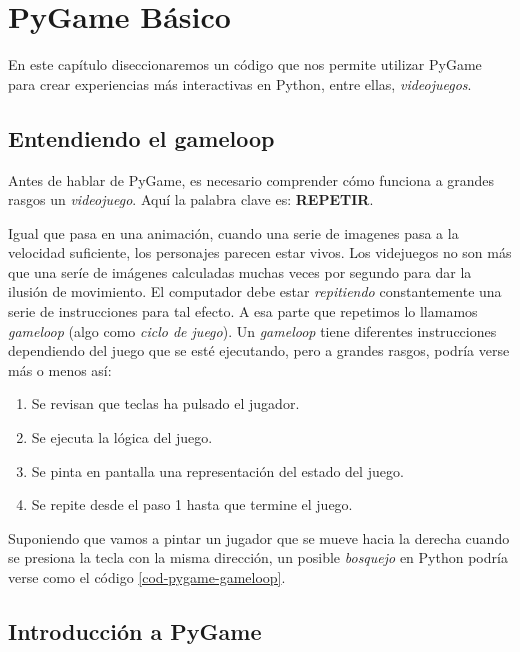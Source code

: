 \chapter{PyGame Básico}
\label{chap:pygame}

En este capítulo diseccionaremos un código que nos permite utilizar PyGame para crear experiencias más interactivas en Python, entre ellas, \emph{videojuegos}.

\section{Entendiendo el gameloop}

Antes de hablar de PyGame, es necesario comprender cómo funciona a grandes rasgos un \emph{videojuego}. Aquí la palabra clave es: \textbf{REPETIR}.

Igual que pasa en una animación, cuando una serie de imagenes pasa a la velocidad suficiente, los personajes parecen estar vivos. Los videjuegos no son más que una seríe de imágenes calculadas muchas veces por segundo para dar la ilusión de movimiento. El computador debe estar \emph{repitiendo} constantemente una serie de instrucciones para tal efecto. A esa parte que repetimos lo llamamos \emph{gameloop} (algo como \emph{ciclo de juego}). Un \emph{gameloop} tiene diferentes instrucciones dependiendo del juego que se esté ejecutando, pero a grandes rasgos, podría verse más o menos así:

\begin{enumerate}
\item Se revisan que teclas ha pulsado el jugador.
\item Se ejecuta la lógica del juego.
\item Se pinta en pantalla una representación del estado del juego.
\item Se repite desde el paso 1 hasta que termine el juego.
\end{enumerate}

\newpage

Suponiendo que vamos a pintar un jugador que se mueve hacia la derecha cuando se presiona la tecla con la misma dirección, un posible \emph{bosquejo} en Python podría verse como el código \ref{cod-pygame-gameloop}. 





\section{Introducción a PyGame}

